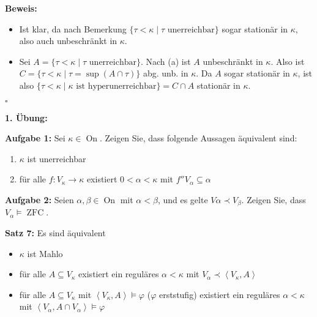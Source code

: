 \documentclass[a4paper,fontsize=11pt]{scrartcl}
\newcommand{\ZFC}{\operatorname{ZFC}}
\newcommand{\On}{\operatorname{On}}
\begin{document}
{\bf Beweis:}
\begin{itemize}
\item[(a)] Ist klar, da nach Bemerkung $\{\tau<\kappa\mid \tau\mbox{ unerreichbar}\}$  sogar stationär in $\kappa$, also auch unbeschränkt in $\kappa$.
\item[(b)] Sei $A=\{\tau<\kappa\mid \tau \mbox{ unerreichbar}\}$. Nach
  (a) ist $A$ unbeschränkt in $\kappa$. Also ist $C=\{ \tau<\kappa\mid
  \tau=\sup(A\cap\tau)\}$ abg. unb. in $\kappa$. Da $A$ sogar
  stationär in $\kappa$, ist also $\{\tau<\kappa\mid \kappa \mbox{ ist
    hyperunerreichbar}\}=C\cap A$ stationär in $\kappa$.
\end{itemize}

\hfill $\square$


{\bf 1. Übung:}

{\bf Aufgabe 1:} Sei $\kappa\in\On$. Zeigen Sie, dass folgende
Aussagen äquivalent sind:
\begin{enumerate}
\item $\kappa$ ist unerreichbar
\item für alle $f:V_\kappa\rightarrow\kappa$ existiert
  $0<\alpha<\kappa$ mit $f''V_\alpha\subseteq\alpha$
\end{enumerate}

{\bf Aufgabe 2:} Seien $\alpha,\beta\in\On$ mit $\alpha<\beta$, und es
gelte $V\alpha\prec V_\beta$. Zeigen Sie, dass $V_\alpha\models\ZFC$.

{\bf Satz 7:} Es sind äquivalent
\begin{itemize}
  \item[(1)] $\kappa$ ist Mahlo
  \item[(2)] für alle $A\subseteq V_\kappa$ existiert ein reguläres
    $\alpha<\kappa$ mit $V_\alpha\prec\left<V_\kappa,A\right>$
  \item[(3)] für alle $A\subseteq V_\kappa$ mit
    $\left<V_\kappa,A\right>\models\varphi$ ($\varphi$ erststufig)
    existiert ein reguläres $\alpha<\kappa$ mit $\left<V_\alpha,A\cap
    V_\alpha\right>\models\varphi$
\end{itemize}
\end{document}

